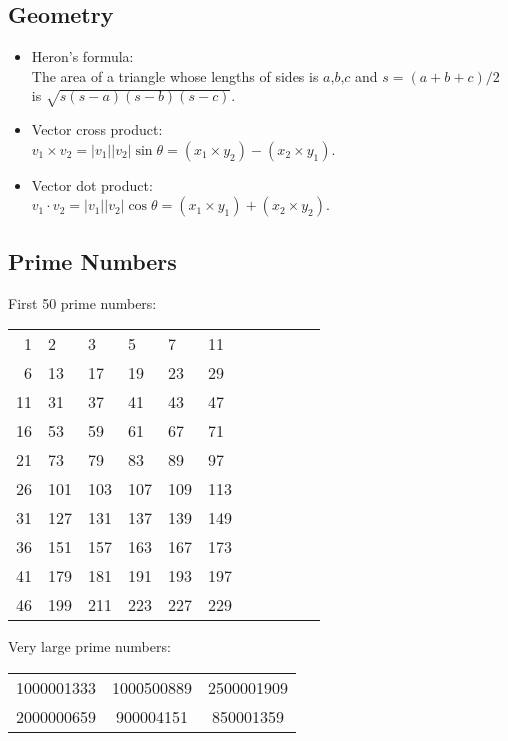 \documentclass[twocolumn]{article}
\begin{document}
\subsection{Geometry}

\begin{itemize}
    \item Heron's formula:\\ The area of a triangle whose lengths of sides is $a$,$b$,$c$ and $s = (a + b + c) / 2$ is $\sqrt{s(s-a)(s-b)(s-c)}$.
    \item Vector cross product:\\ $v_1 \times v_2 = |v_1||v_2| \sin \theta = (x_1 \times y_2) - (x_2 \times y_1)$.
    \item Vector dot product:\\ $v_1 \cdot v_2 = |v_1||v_2| \cos \theta = (x_1 \times y_1) + (x_2 \times y_2)$.
\end{itemize}

\subsection{Prime Numbers}

First 50 prime numbers:\\
\begin{center}
    \begin{tabular}{r|llllllllll}
        1 & 2 & 3 & 5 & 7 & 11 \\
        6 & 13 & 17 & 19 & 23 & 29 \\
        11 & 31 & 37 & 41 & 43 & 47 \\
        16 & 53 & 59 & 61 & 67 & 71 \\
        21 & 73 & 79 & 83 & 89 & 97 \\
        26 & 101 & 103 & 107 & 109 & 113 \\
        31 & 127 & 131 & 137 & 139 & 149 \\
        36 & 151 & 157 & 163 & 167 & 173 \\
        41 & 179 & 181 & 191 & 193 & 197 \\
        46 & 199 & 211 & 223 & 227 & 229
    \end{tabular}
\end{center}

Very large prime numbers:\\
\begin{tabular}{ccc}
    1000001333 & 1000500889 & 2500001909 \\
    2000000659 & 900004151 & 850001359
\end{tabular}
\end{document}

